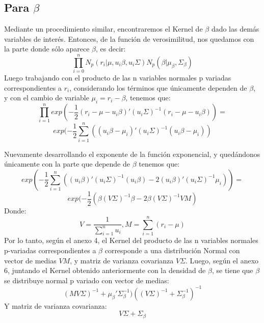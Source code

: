 \subsection{Para $\beta$}
Mediante un procedimiento similar, encontraremos el Kernel de $\beta$ dado las demás variables de interés. Entonces, de la función de verosimilitud, nos quedamos con la parte donde sólo aparece $\beta$, es decir:
\begin{equation*}
\prod_{i=0}^{n}N_{p}(r_{i}|\mu,u_{i}\beta,u_{i}\Sigma)N_{p}(\beta|\mu_{\beta},\Sigma_{\beta})
\end{equation*}
Luego trabajando con el producto de las n variables normales p variadas correspondientes a $r_{i}$,  considerando los términos que únicamente dependen de $\beta$, y con el cambio de variable $\mu_{i}=r_{i}-\beta$, tenemos que:
\begin{equation*}
\prod_{i=1}^{n}exp(-\dfrac{1}{2}(r_{i}-\mu-u_{i}\beta)'(u_{i}\Sigma)^{-1}(r_{i}-\mu-u_{i}\beta))=
\end{equation*}
\begin{equation*}
exp(-\frac{1}{2}\sum_{i=1}^{n}((u_{i}\beta-\mu_{i})'(u_{i}\Sigma)^{-1}(u_{i}\beta-\mu_{i}))
\end{equation*}

Nuevamente desarrollando el exponente de la función exponencial, y quedándonos únicamente con la parte que depende de $\beta$ tenemos que:
\begin{equation*}
exp(-\dfrac{1}{2}\sum_{i=1}^{n}((u_{i}\beta)'(u_{i}\Sigma)^{-1}(u_{i}\beta)-2(u_{i}\beta)'(u_{i}\Sigma)^{-1}\mu_{i}))=
\end{equation*}
\begin{equation*}
exp(-\dfrac{1}{2}(\beta(V\Sigma)^{-1}\beta-2\beta(V\Sigma)^{-1}VM)
\end{equation*}
Donde:
\begin{equation*}
V=\frac{1}{\sum_{i=1}^{n}u_{i}} , M=\sum_{i=1}^{n}(r_{i}-\mu)
\end{equation*}
 Por lo tanto, según el anexo 4, el Kernel del producto de las n variables normales p-variadas correspondientes a $\beta$ corresponde a una distribución Normal con vector de medias $VM$, y matriz de varianza covarianza $V\Sigma$.
Luego, según el anexo 6, juntando el Kernel obtenido anteriormente con la densidad de $\beta$, se tiene que $\beta$ se distribuye normal p variado con vector de medias: 
\begin{equation*}
(MV\Sigma)^{-1}+\mu_{\beta}'\Sigma_{\beta}^{-1})((V\Sigma)^{-1}+\Sigma_{\beta}^{-1})^{-1}
\end{equation*}
Y matriz de varianza covarianza:
\begin{equation*}
V\Sigma+\Sigma_{\beta}
\end{equation*}

